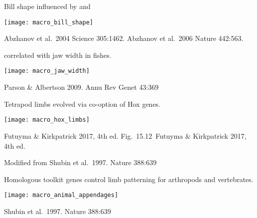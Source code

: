 \documentclass[t]{beamer}
\newcommand{\futuyma}[1]{%
	\ifthenelse{\isempty{#1}}%
	{Futuyma \& Kirkpatrick 2017, 4th ed.}%
	{Fig.~#1~Futuyma \& Kirkpatrick 2017, 4th ed.}%
}
\newcommand{\backskip}{\vspace{-0.5\baselineskip}}
\begin{document}
\begin{frame}{Bill shape influenced by  and }

\backskip

\centering

\texttt{[image: macro\_bill\_shape]}

\tinyfill Abzhanov et al.~2004 Science 305:1462. Abzhanov et al.~2006 Nature 442:563.

\end{frame}


\begin{frame}{ correlated with jaw width in fishes.}

\backskip

\centering

\texttt{[image: macro\_jaw\_width]}

\tinyfill Parson \& Albertson 2009. Annu Rev Genet 43:369


\end{frame}



\begin{frame}{Tetrapod limbs evolved via co-option of Hox genes.}

\backskip

\centering

\texttt{[image: macro\_hox\_limbs]}

\tinyfill \futuyma{15.12}

\end{frame}


{
\begin{frame}[b]

\tinyfill Modified from Shubin et al.~1997. Nature 388:639

\end{frame}
}


\begin{frame}{Homologous toolkit genes control limb patterning for arthropods and vertebrates.}

\backskip

\centering

\texttt{[image: macro\_animal\_appendages]}

\tinyfill Shubin et al.~1997. Nature 388:639

\end{frame}
\end{document}
